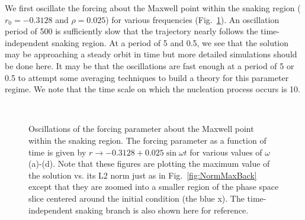 \documentclass[pre,preprint,superscriptaddress]{revtex4-1}
\begin{document}
We first oscillate the forcing about the Maxwell point within the snaking region ($r_0=-0.3128$ and $\rho = 0.025$)  for various frequencies (Fig.~\ref{fig:OscInSnake}).   An oscillation period of 500 is sufficiently slow that the trajectory nearly follows the time-independent snaking region.  At a period of 5 and 0.5, we see that the solution may be approaching a steady orbit in time but more detailed simulations should be done here.  It may be that the oscillations are fast enough at a period of 5 or 0.5 to attempt some averaging techniques to build a theory for this parameter regime.   We note that the time scale on which the nucleation process occurs is 10.
\begin{figure}[!htb]
  \begin{center}
    \mbox{
      }
    \caption{Oscillations of the forcing parameter about the Maxwell point within the snaking region.  The forcing parameter as a function of time is given by $r\rightarrow-0.3128+ 0.025\sin\omega t$ for various values of $\omega$ (a)-(d).  Note that these figures are plotting the maximum value of the solution vs. its L2 norm just as in Fig.~\ref{fig:NormMaxBack} except that they are zoomed into a smaller region of the phase space slice centered around the initial condition (the blue x).  The time-independent snaking branch is also shown here for reference. }
    \label{fig:OscInSnake}
  \end{center}
\end{figure} 
\end{document}
